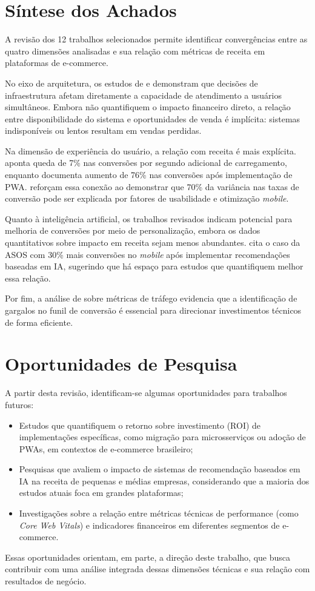 \section{Síntese dos Achados}

A revisão dos 12 trabalhos selecionados permite identificar convergências entre as quatro dimensões analisadas e sua relação com métricas de receita em plataformas de e-commerce.

No eixo de arquitetura, os estudos de \cite{ubur_reviewing_2023} e \cite{satwika_performance_2024} demonstram que decisões de infraestrutura afetam diretamente a capacidade de atendimento a usuários simultâneos. Embora não quantifiquem o impacto financeiro direto, a relação entre disponibilidade do sistema e oportunidades de venda é implícita: sistemas indisponíveis ou lentos resultam em vendas perdidas.

Na dimensão de experiência do usuário, a relação com receita é mais explícita. \cite{bansal_seo_2024} aponta queda de 7\% nas conversões por segundo adicional de carregamento, enquanto \cite{google_alibaba_2016} documenta aumento de 76\% nas conversões após implementação de PWA. \cite{nawir_impact_2024} reforçam essa conexão ao demonstrar que 70\% da variância nas taxas de conversão pode ser explicada por fatores de usabilidade e otimização \textit{mobile}.

Quanto à inteligência artificial, os trabalhos revisados indicam potencial para melhoria de conversões por meio de personalização, embora os dados quantitativos sobre impacto em receita sejam menos abundantes. \cite{jain_role_2025} cita o caso da ASOS com 30\% mais conversões no \textit{mobile} após implementar recomendações baseadas em IA, sugerindo que há espaço para estudos que quantifiquem melhor essa relação.

Por fim, a análise de \cite{muralidhar_clicks_2024} sobre métricas de tráfego evidencia que a identificação de gargalos no funil de conversão é essencial para direcionar investimentos técnicos de forma eficiente.

\section{Oportunidades de Pesquisa}

A partir desta revisão, identificam-se algumas oportunidades para trabalhos futuros:

\begin{itemize}
    \item Estudos que quantifiquem o retorno sobre investimento (ROI) de implementações específicas, como migração para microsserviços ou adoção de PWAs, em contextos de e-commerce brasileiro;
    \item Pesquisas que avaliem o impacto de sistemas de recomendação baseados em IA na receita de pequenas e médias empresas, considerando que a maioria dos estudos atuais foca em grandes plataformas;
    \item Investigações sobre a relação entre métricas técnicas de performance (como \textit{Core Web Vitals}) e indicadores financeiros em diferentes segmentos de e-commerce.
\end{itemize}

Essas oportunidades orientam, em parte, a direção deste trabalho, que busca contribuir com uma análise integrada dessas dimensões técnicas e sua relação com resultados de negócio.
